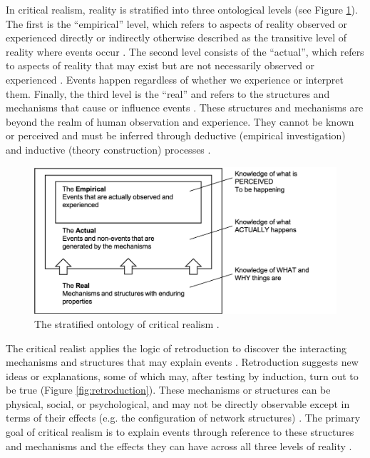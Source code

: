 In critical realism, reality is stratified into three ontological levels (see Figure \ref{fig:stratified_reality}). The first is the \enquote{empirical} level, which refers to aspects of reality observed or experienced directly or indirectly otherwise described as the transitive level of reality where events occur \citep{fletcher2017applying}. The second level consists of the \enquote{actual}, which refers to aspects of reality that may exist but are not necessarily observed or experienced \citep{mcevoy2006critical}. Events happen regardless of whether we experience or interpret them. Finally, the third level is the \enquote{real} and refers to the structures and mechanisms that cause or influence events \citep{zachariadis2013methodological}. These structures and mechanisms are beyond the realm of human observation and experience. They cannot be known or perceived and must be inferred through deductive (empirical investigation) and inductive (theory construction) processes \citep{mcevoy2006critical,wynn2012principles}. \medskip

\begin{figure}
\centering
\includegraphics[width=0.9\linewidth]{Images/stratified_reality.png}
\caption[The stratified ontology of critical realism]{The stratified ontology of critical realism \citep{bhaskar2013realist,mingers2006realising}.}
\label{fig:stratified_reality}
\end{figure}

The critical realist applies the logic of retroduction to discover the interacting mechanisms and structures that may explain events \citep{sayer1999realism,wynn2012principles}. Retroduction suggests new ideas or explanations, some of which may, after testing by induction, turn out to be true (Figure \ref{fig:retroduction}). These mechanisms or structures can be physical, social, or psychological, and may not be directly observable except in terms of their effects (e.g. the configuration of network structures) \citep{mcavoy2018critical}. The primary goal of critical realism is to explain events through reference to these structures and mechanisms and the effects they can have across all three levels of reality \citep{wynn2012principles,fletcher2017applying}. \medskip

